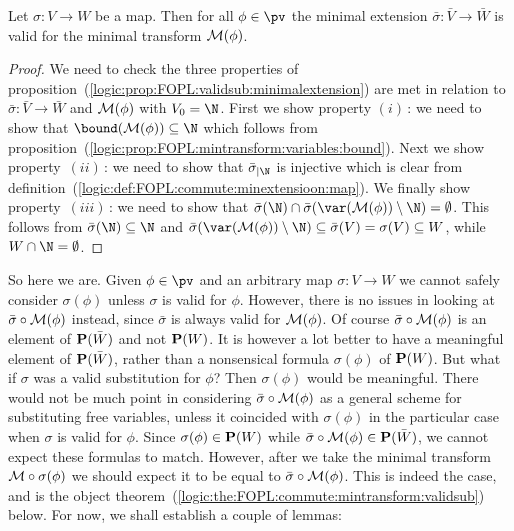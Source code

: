 \begin{prop}\label{logic:def:FOPL:commute:minextension:valid}
Let $\sigma:V\to W$ be a map. Then for all $\phi\in\pv$ the minimal
extension $\bar{\sigma}:\bar{V}\to\bar{W}$ is valid for the minimal
transform ${\cal M}(\phi)$.
\end{prop}
\begin{proof}
We need to check the three properties of
proposition~(\ref{logic:prop:FOPL:validsub:minimalextension}) are
met in relation to $\bar{\sigma}:\bar{V}\to\bar{W}$ and ${\cal
M}(\phi)$ with $V_{0}=\N$. First we show property $(i)$\,: we need
to show that $\bound({\cal M}(\phi))\subseteq\N$ which follows from
proposition~(\ref{logic:prop:FOPL:mintransform:variables:bound}).
Next we show property~$(ii)$\,: we need to show that
$\bar{\sigma}_{|\N}$ is injective which is clear from
definition~(\ref{logic:def:FOPL:commute:minextensioon:map}). We
finally show property~$(iii)$\,: we need to show that
$\bar{\sigma}(\N)\cap\bar{\sigma}(\var({\cal
M}(\phi))\setminus\N)=\emptyset$. This follows from
$\bar{\sigma}(\N)\subseteq\N$ and $\bar{\sigma}(\var({\cal
M}(\phi))\setminus\N)\subseteq\bar{\sigma}(V)=\sigma(V)\subseteq W$,
while $W\cap\N = \emptyset$.
\end{proof}

So here we are. Given $\phi\in\pv$ and an arbitrary map $\sigma:V\to
W$ we cannot safely consider $\sigma(\phi)$ unless $\sigma$ is valid
for $\phi$. However, there is no issues in looking at
$\bar{\sigma}\circ{\cal M}(\phi)$ instead, since $\bar{\sigma}$ is
always valid for ${\cal M}(\phi)$. Of course $\bar{\sigma}\circ{\cal
M}(\phi)$ is an element of ${\bf P}(\bar{W})$ and not ${\bf P}(W)$.
It is however a lot better to have a meaningful element of ${\bf
P}(\bar{W})$, rather than a nonsensical formula $\sigma(\phi)$ of
${\bf P}(W)$. But what if $\sigma$ was a valid substitution for
$\phi$? Then $\sigma(\phi)$ would be meaningful. There would not be
much point in considering $\bar{\sigma}\circ{\cal M}(\phi)$ as a
general scheme for substituting free variables, unless it coincided
with $\sigma(\phi)$ in the particular case when $\sigma$ is valid
for $\phi$. Since $\sigma(\phi)\in{\bf P}(W)$ while
$\bar{\sigma}\circ{\cal M}(\phi)\in{\bf P}(\bar{W})$, we cannot
expect these formulas to match. However, after we take the minimal
transform  ${\cal M}\circ\sigma(\phi)$ we should expect it to be
equal to $\bar{\sigma}\circ{\cal M}(\phi)$. This is indeed the case,
and is the object
theorem~(\ref{logic:the:FOPL:commute:mintransform:validsub}) below.
For now, we shall establish a couple of lemmas:


